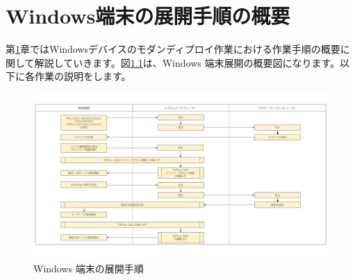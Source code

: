 \chapter{Windows端末の展開手順の概要}
\label{chap:Windows端末の展開手順の概要}

第\ref{chap:Windows端末の展開手順の概要}章ではWindowsデバイスのモダンディプロイ作業における作業手順の概要に関して解説していきます。図\ref{fig:StepbyStep}は、Windows 端末展開の概要図になります。以下に各作業の説明をします。

\begin{figure}[htbp]
    \centering
    \includegraphics[width=17cm]{figures/StepbyStep.png}
    \caption{Windows 端末の展開手順}
    \label{fig:StepbyStep}
    \vspace{15cm}
\end{figure}

